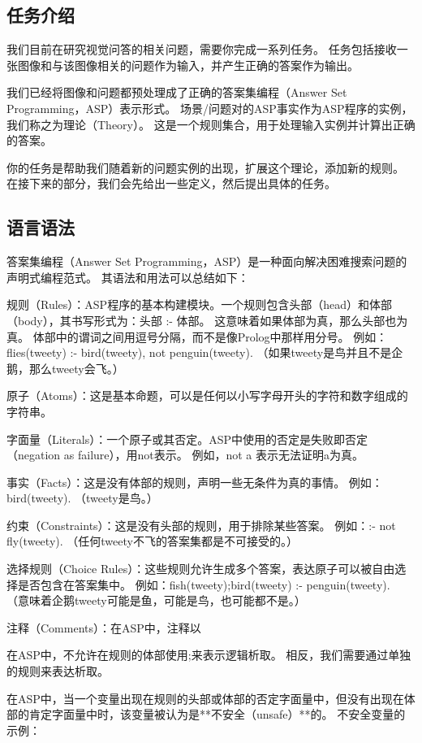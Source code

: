 \subsection{任务介绍}
\label{appendix:task-introduction}
我们目前在研究视觉问答的相关问题，需要你完成一系列任务。
任务包括接收一张图像和与该图像相关的问题作为输入，并产生正确的答案作为输出。

我们已经将图像和问题都预处理成了正确的答案集编程（Answer Set Programming，ASP）表示形式。
场景/问题对的ASP事实作为ASP程序的实例，我们称之为理论（Theory）。
这是一个规则集合，用于处理输入实例并计算出正确的答案。

你的任务是帮助我们随着新的问题实例的出现，扩展这个理论，添加新的规则。
在接下来的部分，我们会先给出一些定义，然后提出具体的任务。
\subsection{语言语法}
\label{appendix:asp-grammar}
答案集编程（Answer Set Programming，ASP）是一种面向解决困难搜索问题的声明式编程范式。
其语法和用法可以总结如下：

规则（Rules）：ASP程序的基本构建模块。一个规则包含头部（head）和体部（body），其书写形式为：头部 :- 体部。
这意味着如果体部为真，那么头部也为真。
体部中的谓词之间用逗号分隔，而不是像Prolog中那样用分号。
例如：flies(tweety) :- bird(tweety), not penguin(tweety). （如果tweety是鸟并且不是企鹅，那么tweety会飞。）

原子（Atoms）：这是基本命题，可以是任何以小写字母开头的字符和数字组成的字符串。

字面量（Literals）：一个原子或其否定。ASP中使用的否定是失败即否定（negation as failure），用not表示。
例如，not a 表示无法证明a为真。

事实（Facts）：这是没有体部的规则，声明一些无条件为真的事情。
例如：bird(tweety). （tweety是鸟。）

约束（Constraints）：这是没有头部的规则，用于排除某些答案。
例如：:- not fly(tweety). （任何tweety不飞的答案集都是不可接受的。）

选择规则（Choice Rules）：这些规则允许生成多个答案，表达原子可以被自由选择是否包含在答案集中。
例如：{fish(tweety);bird(tweety)} :- penguin(tweety). （意味着企鹅tweety可能是鱼，可能是鸟，也可能都不是。）

注释（Comments）：在ASP中，注释以%

在ASP中，不允许在规则的体部使用;来表示逻辑析取。
相反，我们需要通过单独的规则来表达析取。

在ASP中，当一个变量出现在规则的头部或体部的否定字面量中，但没有出现在体部的肯定字面量中时，该变量被认为是**不安全（unsafe）**的。
不安全变量的示例：

